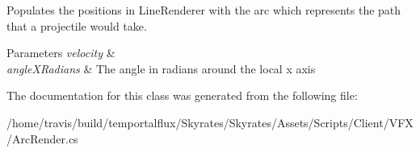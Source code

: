 Populates the positions in Line\-Renderer with the arc which represents the path that a projectile would take. 


\begin{DoxyParams}{Parameters}
{\em velocity} & \\
\hline
{\em angle\-X\-Radians} & The angle in radians around the local x axis\\
\hline
\end{DoxyParams}


The documentation for this class was generated from the following file\-:\begin{DoxyCompactItemize}
\item 
/home/travis/build/temportalflux/\-Skyrates/\-Skyrates/\-Assets/\-Scripts/\-Client/\-V\-F\-X/Arc\-Render.\-cs\end{DoxyCompactItemize}
